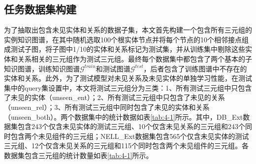 \subsection{任务数据集构建}
为了抽取出包含未见实体和关系的数据子集，本文首先构建一个包含所有三元组的实例知识图谱，在其中随机选取100个根实体节点并将每个节点的10个相邻接点组成测试子图，将子图中1/10的实体和关系标记为测试集，并从训练集中剔除这些实体和关系相关的三元组作为测试三元组。最终每个数据集中都包含了两个基本的子知识图谱，训练知识图谱\(\mathcal{G}^{train}\)和测试图谱\(\mathcal{G}^{test}\)，后者包含了训练图谱中不存在的实体和关系。此外，为了测试模型对未见关系及未见实体的单独学习性能，在测试集中的query集设置中，本文将测试三元组分为三类：1、所有测试三元组中只包含了未见的实体（unseen\_ent）；2、所有测试三元组中只包含了未见的关系（unseen\_rel）；3、所有测试三元组中同时包含了未见的实体和关系（unseen\_both）。两个数据集中的统计数据如表\ref{tab:4-1}所示。其中，DB\_Ext数据集包含243个仅含未见实体的测试三元组、10个仅含未见关系的三元组和243个同时包含两个未见组件的三元组；NELL\_Ext数据集包含565个仅含未见实体的测试三元组、12个仅含未见关系的三元组和115个同时包含两个未见组件的三元组。各数据集包含三元组的统计数量如表\ref{tab:4-1}所示。
